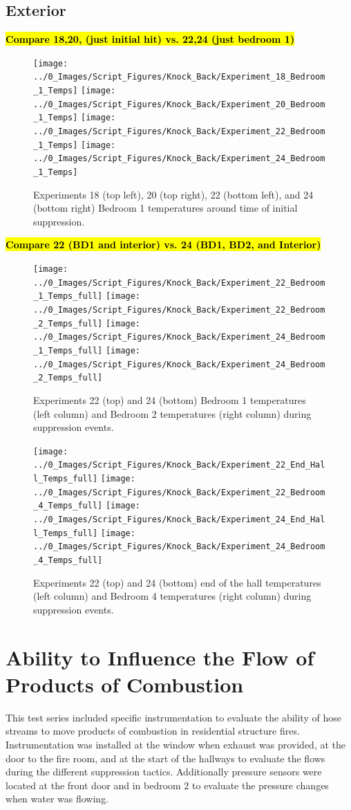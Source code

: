 \documentclass[12pt,oneside]{book}
\begin{document}
\subsection{Exterior}
\textbf{\hl{Compare 18,20, (just initial hit) vs. 22,24 (just bedroom 1)}}
\begin{figure}[H]
	\centering
	\texttt{[image: ../0\_Images/Script\_Figures/Knock\_Back/Experiment\_18\_Bedroom\_1\_Temps]}
	\texttt{[image: ../0\_Images/Script\_Figures/Knock\_Back/Experiment\_20\_Bedroom\_1\_Temps]}
	\texttt{[image: ../0\_Images/Script\_Figures/Knock\_Back/Experiment\_22\_Bedroom\_1\_Temps]}
	\texttt{[image: ../0\_Images/Script\_Figures/Knock\_Back/Experiment\_24\_Bedroom\_1\_Temps]}
	\caption[]{Experiments 18 (top left), 20 (top right), 22 (bottom left), and 24 (bottom right) Bedroom 1 temperatures around time of initial suppression.}
	\label{fig:knockback_ext_1}
\end{figure}
\clearpage

\textbf{\hl{Compare 22 (BD1 and interior) vs. 24 (BD1, BD2, and Interior)}}
\begin{figure}[H]
	\centering
	\texttt{[image: ../0\_Images/Script\_Figures/Knock\_Back/Experiment\_22\_Bedroom\_1\_Temps\_full]}
	\texttt{[image: ../0\_Images/Script\_Figures/Knock\_Back/Experiment\_22\_Bedroom\_2\_Temps\_full]}
	\texttt{[image: ../0\_Images/Script\_Figures/Knock\_Back/Experiment\_24\_Bedroom\_1\_Temps\_full]}
	\texttt{[image: ../0\_Images/Script\_Figures/Knock\_Back/Experiment\_24\_Bedroom\_2\_Temps\_full]}
	\caption[]{Experiments 22 (top) and 24 (bottom) Bedroom 1 temperatures (left column) and Bedroom 2 temperatures (right column) during suppression events.}
	\label{fig:knockback_ext_2}
\end{figure}
\clearpage

\begin{figure}[H]
	\centering
	\texttt{[image: ../0\_Images/Script\_Figures/Knock\_Back/Experiment\_22\_End\_Hall\_Temps\_full]}
	\texttt{[image: ../0\_Images/Script\_Figures/Knock\_Back/Experiment\_22\_Bedroom\_4\_Temps\_full]}
	\texttt{[image: ../0\_Images/Script\_Figures/Knock\_Back/Experiment\_24\_End\_Hall\_Temps\_full]}
	\texttt{[image: ../0\_Images/Script\_Figures/Knock\_Back/Experiment\_24\_Bedroom\_4\_Temps\_full]}
	\caption[]{Experiments 22 (top) and 24 (bottom) end of the hall temperatures (left column) and Bedroom 4 temperatures (right column) during suppression events.}
	\label{fig:knockback_ext_3}
\end{figure}
\clearpage

\section{Ability to Influence the Flow of Products of Combustion}
This test series included specific instrumentation to evaluate the ability of hose streams to move products of combustion in residential structure fires. Instrumentation was installed at the window when exhaust was provided, at the door to the fire room, and at the start of the hallways to evaluate the flows during the different suppression tactics. Additionally pressure sensors were located at the front door and in bedroom 2 to evaluate the pressure changes when water was flowing. 
\end{document}

